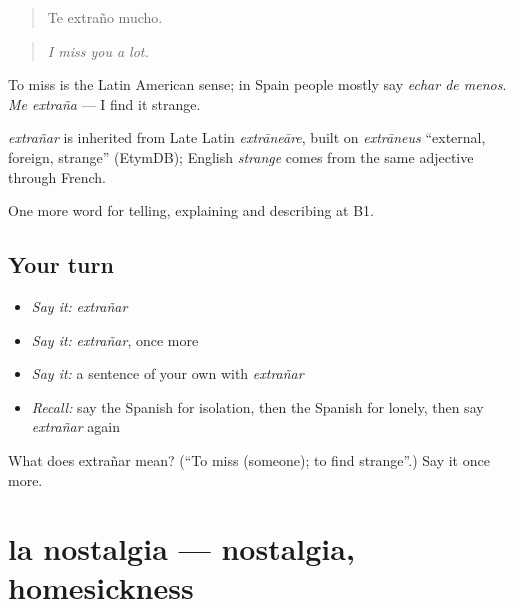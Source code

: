 \begin{quote}
Te extraño mucho.
\end{quote}

\begin{quote}
\emph{I miss you a lot.}
\end{quote}

To miss is the Latin American sense; in Spain people mostly say \emph{echar de menos}. \emph{Me extraña} — I find it strange.

\begin{cousinweb}
\emph{extrañar} is inherited from Late Latin \emph{extrāneāre}, built on \emph{extrāneus} \textquotedblleft{}external, foreign, strange\textquotedblright{} (EtymDB); English \emph{strange} comes from the same adjective through French.
\end{cousinweb}

\begin{grammarlens}[title={What you've built}]
One more word for telling, explaining and describing at B1.
\end{grammarlens}

\subsection*{Your turn}
\begin{itemize}
\raggedright
  \item \emph{Say it:} \emph{extrañar}
  \item \emph{Say it:} \emph{extrañar}, once more
  \item \emph{Say it:} a sentence of your own with \emph{extrañar}
  \item \emph{Recall:} say the Spanish for isolation, then the Spanish for lonely, then say \emph{extrañar} again
\end{itemize}

\begin{tcolorbox}[breakable,colback=teal!4,colframe=teal!35!black,title={Before you move on}]
What does extrañar mean? (\textquotedblleft{}To miss (someone); to find strange\textquotedblright{}.) Say it once more.
\end{tcolorbox}
\section[la nostalgia]{la nostalgia — nostalgia, homesickness}

\label{lesson:ES-C709-nostalgia}



